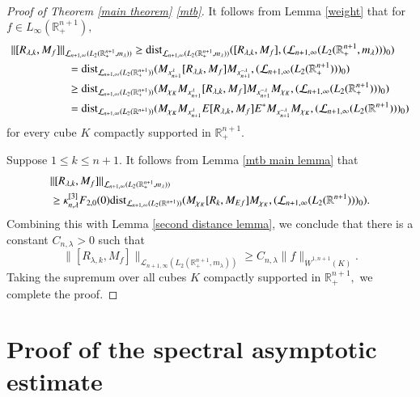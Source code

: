 \documentclass{amsart}
\begin{document}
\begin{proof}[Proof of Theorem \ref{main theorem} \eqref{mtb}] It follows from Lemma \ref{weight} that for $f\in L_{\infty}(\mathbb{R}^{n+1}_+),$
\begin{align*}
\|[R_{\lambda,k},M_f]\|_{\mathcal{L}_{n+1,\infty}(L_2(\mathbb{R}^{n+1}_+,m_{\lambda}))}&\geq {\rm dist}_{\mathcal{L}_{n+1,\infty}(L_2(\mathbb{R}^{n+1}_+,m_{\lambda}))}([R_{\lambda,k},M_f],(\mathcal{L}_{n+1,\infty}(L_2(\mathbb{R}^{n+1}_+,m_{\lambda})))_0)\\
&\hspace{-2.0cm}={\rm dist}_{\mathcal{L}_{n+1,\infty}(L_2(\mathbb{R}^{n+1}_+))}(M_{x_{n+1}^{\lambda}}[R_{\lambda,k},M_f]M_{x_{n+1}^{-\lambda}},(\mathcal{L}_{n+1,\infty}(L_2(\mathbb{R}^{n+1}_+)))_0)\\
&\hspace{-2.0cm}\geq {\rm dist}_{\mathcal{L}_{n+1,\infty}(L_2(\mathbb{R}^{n+1}_+))}(M_{\chi_K} M_{x_{n+1}^{\lambda}}[R_{\lambda,k},M_f]M_{x_{n+1}^{-\lambda}} M_{\chi_K},(\mathcal{L}_{n+1,\infty}(L_2(\mathbb{R}^{n+1}_+)))_0)\\
&\hspace{-2.0cm}={\rm dist}_{\mathcal{L}_{n+1,\infty}(L_2(\mathbb{R}^{n+1}))}(M_{\chi_K} M_{x_{n+1}^{\lambda}}E[R_{\lambda,k},M_f]E^{\ast}M_{x_{n+1}^{-\lambda}} M_{\chi_K},(\mathcal{L}_{n+1,\infty}(L_2(\mathbb{R}^{n+1})))_0)
\end{align*}
for every cube $K$ compactly supported in $\mathbb{R}^{n+1}_+.$	

Suppose $1\leq k\leq n+1.$ It follows from Lemma \ref{mtb main lemma} that
\begin{align*}
&\|[R_{\lambda,k},M_f]\|_{\mathcal{L}_{n+1,\infty}(L_2(\mathbb{R}^{n+1}_+,m_{\lambda}))}\\
&\geq \kappa^{[3]}_{n,\lambda}F_{2,0}(0){\rm dist}_{\mathcal{L}_{n+1,\infty}(L_2(\mathbb{R}^{n+1}))}(M_{\chi_K} [R_k,M_{Ef}] M_{\chi_K},(\mathcal{L}_{n+1,\infty}(L_2(\mathbb{R}^{n+1})))_0).
\end{align*}
Combining this with Lemma \ref{second distance lemma}, we conclude that there is a constant $C_{n,\lambda}>0$ such that
$$\|[R_{\lambda,k},M_f]\|_{\mathcal{L}_{n+1,\infty}(L_2(\mathbb{R}^{n+1}_+,m_{\lambda}))}\geq C_{n,\lambda} \|f\|_{\dot{W}^{1,n+1}(K)}.$$
Taking the supremum over all cubes $K$ compactly supported in $\mathbb{R}^{n+1}_+,$ we complete the proof.	
\end{proof}


\section{Proof of the spectral asymptotic estimate}
\setcounter{equation}{0}
\end{document}
